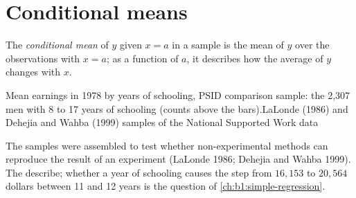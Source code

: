 \section{Conditional means}\label{sec:b1:describing-data:conditional}

\begin{definition}\label{def:b1:describing-data:conditional-mean}
The \emph{conditional mean} of $y$ given $x = a$ in a sample is the mean of $y$ over
the observations with $x = a$; as a function of $a$, it describes how the average
of $y$ changes with $x$.
\end{definition}

\label{lst:b1:describing-data:groups}

\label{out:b1:describing-data:groups}

\begin{omchart}{Mean earnings in 1978 by years of schooling, PSID comparison
sample: the 2,307 men with 8 to 17 years of schooling (counts above the
bars).}{LaLonde (1986) and Dehejia and
Wahba (1999) samples of the National Supported Work data}
\end{omchart}

The samples were assembled to test whether non-experimental methods can
reproduce the result of an experiment (LaLonde 1986; Dehejia and Wahba
1999). %
The  describe; whether a year of schooling causes the
step from $16{,}153$ to $20{,}564$ dollars between 11 and 12 years is the question of
\cref{ch:b1:simple-regression}.

